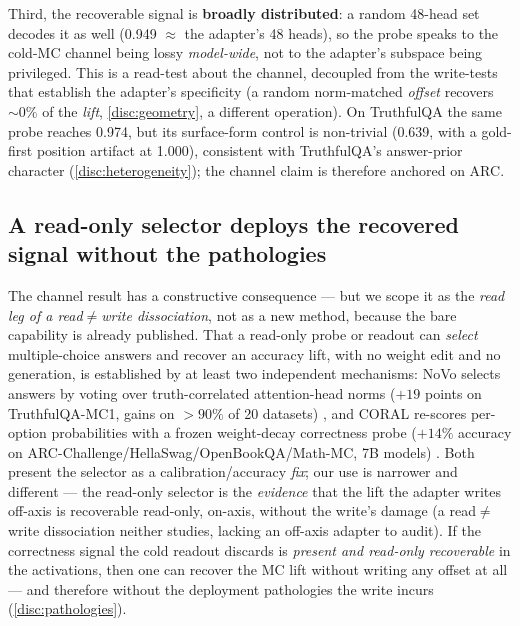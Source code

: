 Third, the recoverable signal is \textbf{broadly distributed}: a random 48-head set
decodes it as well (0.949 ${\approx}$ the adapter's 48 heads), so the probe speaks
to the cold-MC channel being lossy \emph{model-wide}, not to the adapter's subspace
being privileged. This is a read-test about the channel, decoupled from the
write-tests that establish the adapter's specificity (a random norm-matched
\emph{offset} recovers ${\sim}0\%$ of the \emph{lift}, \cref{disc:geometry}, a
different operation). On TruthfulQA the same probe reaches 0.974, but its
surface-form control is non-trivial (0.639, with a gold-first position artifact at
1.000), consistent with TruthfulQA's answer-prior character
(\cref{disc:heterogeneity}); the channel claim is therefore anchored on ARC.

\subsection{A read-only selector deploys the recovered signal without the
pathologies}\label{disc:selector}

The channel result has a constructive consequence --- but we scope it as the
\emph{read leg of a read${\neq}$write dissociation}, not as a new method, because
the bare capability is already published. That a read-only probe or readout can
\emph{select} multiple-choice answers and recover an accuracy lift, with no weight
edit and no generation, is established by at least two independent mechanisms: NoVo
selects answers by voting over truth-correlated attention-head norms ($+19$ points
on TruthfulQA-MC1, gains on ${>}90\%$ of 20 datasets) \citep{NoVo}, and CORAL
re-scores per-option probabilities with a frozen weight-decay correctness probe
($+14\%$ accuracy on ARC-Challenge/HellaSwag/OpenBookQA/Math-MC, 7B models)
\citep{CORAL}. Both present the selector as a calibration/accuracy \emph{fix}; our
use is narrower and different --- the read-only selector is the \emph{evidence} that
the lift the adapter writes off-axis is recoverable read-only, on-axis, without the
write's damage (a read${\neq}$write dissociation neither studies, lacking an
off-axis adapter to audit). If the correctness signal the cold readout discards is
\emph{present and read-only recoverable} in the activations, then one can recover
the MC lift without writing any offset at all --- and therefore without the
deployment pathologies the write incurs (\cref{disc:pathologies}).

